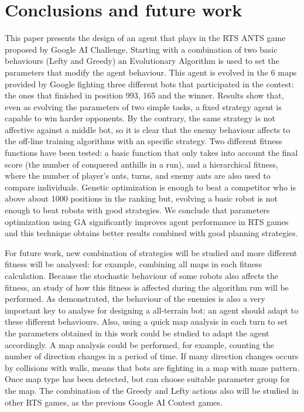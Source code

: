 \documentclass[runningheads]{llncs}
\begin{document}



\section{Conclusions and future work}

This paper presents the design of an agent that plays in the RTS ANTS game proposed by Google AI Challenge. Starting with a combination of two basic behaviours (Lefty and Greedy) an Evolutionary Algorithm is used to set the parameters that modify the agent behaviour. This agent is evolved in the 6 maps provided by Google fighting three different bots that participated in the contest: the ones that finished in position 993, 165 and the winner. Results show that, even as evolving the parameters of two simple tasks, a fixed strategy agent is capable to win harder opponents. By the contrary, the same strategy is not affective against a middle bot, so it is clear that the enemy behaviour affects to the off-line training algorithms with an specific strategy. Two different fitness functions have been tested: a basic function that only takes into account the final score (the number of conquered anthills in a run), and a hierarchical fitness, where the number of player's ants, turns, and enemy ants are also used to compare individuals. Genetic optimization is enough to beat a competitor who is above about 1000 positions in the ranking but, evolving a basic robot is not enough to beat robots with good strategies. We conclude that parameters optimization using GA significantly improves agent performance in RTS games and this technique obtains better results combined with good planning strategies.

For future work, new combination of strategies will be studied and more different fitness will be analysed: for example, combining all maps in each fitness calculation. Because the stochastic behaviour of some robots also affects the fitness, an study of how this fitness is affected during the algorithm run will be performed. As demonstrated, the behaviour of the enemies is also a very important key to analyse for designing a all-terrain bot: an agent should adapt to these different behaviours. Also, using a quick map analysis in each turn to set the parameters obtained in this work could be studied to adapt the agent accordingly. A map analysis could be performed, for example, counting the number of
direction changes in a period of time. If many direction changes occurs by collisions with walls, means that bots are fighting in a map with maze pattern. Once map type has been detected, bot can choose suitable parameter group for the map. The combination of the Greedy and Lefty actions also will be studied in other RTS games, as the previous Google AI Contest games.



\end{document}

